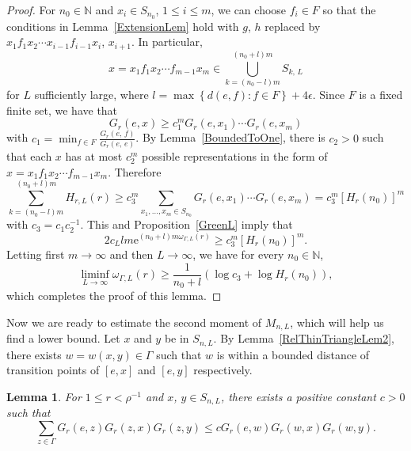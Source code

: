 \documentclass{amsart}
\newtheorem{lem}[thm]{Lemma}
\theoremstyle{definition}
\theoremstyle{remark}
\begin{document}
\begin{proof}
  For $n_0 \in \mathbb{N}$ and $x_i \in S_{n_0}$, $1 \leq i \leq m$, we can choose $f_i \in F$ so that the conditions in Lemma~\ref{ExtensionLem} hold with $g$, $h$ replaced by $x_1f_1x_2\cdots x_{i-1} f_{i-1} x_i$, $x_{i+1}$.  In particular, 
  \[
    x = x_1 f_1 x_2 \cdots f_{m-1} x_m \in \bigcup_{k = (n_0 - l) m}^{(n_0 + l) m} S_{k, \, L}
  \]
  for $L$ sufficiently large,  where $l = \max \left\{ d(e, f) \colon f \in F \right\} + 4 \epsilon$.  Since $F$ is a fixed finite set, we have that 
  \[
    G_r(e, x) \geq c_1^m G_r(e, x_1) \cdots G_r(e, x_m) 
  \]
  with $c_1 = \min_{f \in F} \frac{G_r(e, \, f)}{G_r(e, \, e)}$.  By Lemma~\ref{BoundedToOne}, there is $c_2 > 0$ such that each $x$ has at most $c_2^m$ possible representations in the form of $x = x_1 f_1 x_2 \cdots f_{m-1} x_m$.  Therefore 
  \[
    \sum_{k=(n_0 - l) m}^{(n_0 + l) m} H_{r, L}(r) \geq c_3^m \sum_{x_1, \ldots, x_m \in S_{n_0}} G_r(e, x_1) \cdots G_r(e, x_m) = c_3^m \left[ H_r(n_0) \right]^m  
  \]
  with $c_3 = c_1 c_2^{-1}$.    This and Proposition~\ref{GreenL} imply that
  \[
    2 c_L l m \mathrm{e}^{(n_0 + l) m \omega_{\Gamma, L}(r)} \geq c_3^m \left[ H_r(n_0) \right]^m.   
  \]
  Letting first $m \to \infty$ and then $L \to \infty$, we have for every $n_0 \in \mathbb{N}$, 
  \[
    \liminf_{L \to \infty} \omega_{\Gamma, L}(r) \geq \frac{1}{n_0 + l} \left( \log c_3 + \log H_r(n_0) \right), 
  \]
  which completes the proof of this lemma. 
\end{proof}


Now we are ready to estimate the second moment of $M_{n, L}$, which will help us find a lower bound. 
Let $x$ and $y$ be in $S_{n, L}$.  By Lemma~\ref{RelThinTriangleLem2}, there exists $w = w(x, y) \in \Gamma$ such that $w$ is within a bounded distance of transition points of $[e, x]$ and $[e, y]$ respectively.
\begin{lem}\label{Correlationxy}
  For $1 \leq r < \rho^{-1}$ and $x$, $y \in S_{n, L}$, there exists a positive constant $c > 0$ such that
  \[
    \sum_{z \in \Gamma} G_r(e, z) G_r(z, x) G_r(z, y) \leq c G_r(e, w) G_r(w, x) G_r(w, y).  
  \]
  
\end{lem}
\end{document}
